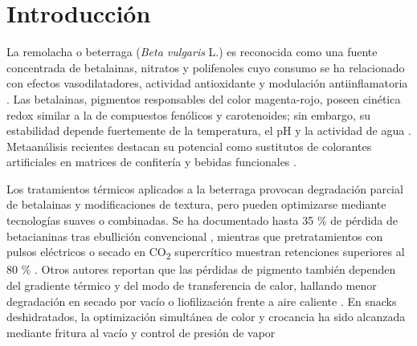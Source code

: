\documentclass[manuscript,screen,review]{acmart}
\begin{document}



\maketitle
\section{Introducción}

   La remolacha o beterraga (\textit{Beta vulgaris} L.) es reconocida como una fuente concentrada de betalainas, nitratos y polifenoles cuyo consumo se ha relacionado con efectos vasodilatadores, actividad antioxidante y modulación antiinflamatoria \citep{Clifford2021,Siervo2016,WoottonBeard2011,Esatbeyoglu2015}%
   . Las betalainas, pigmentos responsables del color magenta-rojo, poseen cinética redox similar a la de compuestos fenólicos y carotenoides; sin embargo, su estabilidad depende fuertemente de la temperatura, el pH y la actividad de agua \citep{Stintzing2002}%
   . Metaanálisis recientes destacan su potencial como sustitutos de colorantes artificiales en matrices de confitería y bebidas funcionales \citep{Neelwarne2013}.

Los tratamientos térmicos aplicados a la beterraga provocan degradación parcial de betalainas y modificaciones de textura, pero pueden optimizarse mediante tecnologías suaves o combinadas.  Se ha documentado hasta 35 \% de pérdida de betacianinas tras ebullición convencional \citep{ArrudaRamos2017}, mientras que pretratamientos con pulsos eléctricos o secado en CO\textsubscript{2} supercrítico muestran retenciones superiores al 80 \% \citep{Nikan2019,Tomic2020}.  Otros autores reportan que las pérdidas de pigmento también dependen del gradiente térmico y del modo de transferencia de calor, hallando menor degradación en secado por vacío o liofilización frente a aire caliente \citep{Ravichandran2013,Nistor2017,Rocchetti2020}.  En snacks deshidratados, la optimización simultánea de color y crocancia ha sido alcanzada mediante fritura al vacío y control de presión de vapor %
\end{document}
